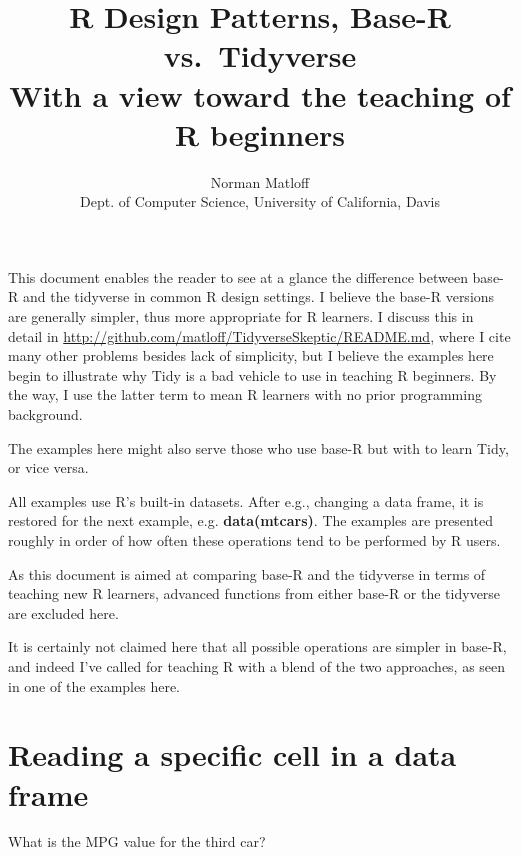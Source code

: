 \documentclass[11pt]{article}
\title{R Design Patterns, Base-R vs.\ Tidyverse \\
   With a view toward the teaching of R beginners}
\author{Norman Matloff \\
      Dept. of Computer Science, University of California, Davis}
\begin{document}
\maketitle

This document enables the reader to see at a glance the difference
between base-R and the tidyverse in common R design settings.  I believe
the base-R versions are generally simpler, thus more appropriate for R
learners.  I discuss this in detail in
\url{http://github.com/matloff/TidyverseSkeptic/README.md}, where I
cite many other problems besides lack of simplicity, but I believe the
examples here begin to illustrate why Tidy is a bad vehicle to use in
teaching R beginners.  By the way, I use the latter term to mean R
learners with no prior programming background.

The examples here might also serve those who use base-R but with to
learn Tidy, or vice versa.

All examples use R's built-in datasets.  After e.g., changing a data
frame, it is restored for the next example, e.g. \textbf{data(mtcars)}.
The examples are presented roughly in order of how often these
operations tend to be performed by R users.

As this document is aimed at comparing base-R and the tidyverse in terms
of teaching new R learners, advanced functions from either base-R or the
tidyverse are excluded here.

It is certainly not claimed here that all possible operations are
simpler in base-R, and indeed I've called for teaching R with a blend of
the two approaches, as seen in one of the examples here.  

\section*{Reading a specific cell in a data frame}

What is the MPG value for the third car? 
\end{document}
